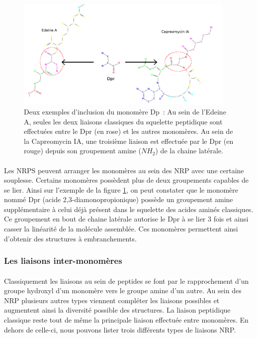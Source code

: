 \documentclass[12pt,french,twoside]{report}
\begin{document}
\begin{figure}[h!]
  \begin{center}
    \includegraphics[width=400px]{Figures/bio/Intro/Dpr/2-3_liaisons.png}
    \caption{\label{DPR_incl}Deux exemples d'inclusion du monomère Dp~:
    Au sein de l'Edeine A, seules les deux liaisons classiques du squelette peptidique sont effectuées entre le Dpr (en rose) et les autres monomères.
    Au sein de la Capreomycin IA, une troisième liaison est effectuée par le Dpr (en rouge) depuis son groupement amine ($NH_2$) de la chaine latérale.}
  \end{center}
\end{figure}

\paragraph{}Les NRPS peuvent arranger les monomères au sein des NRP avec une certaine souplesse.
Certains monomères possèdent plus de deux groupements capables de se lier.
Ainsi sur l'exemple de la figure \ref{DPR_incl}, on peut constater que le monomère nommé Dpr (acide 2,3-diamonopropionique) possède un groupement amine supplémentaire à celui déjà présent dans le squelette des acides aminés classiques.
Ce groupement en bout de chaine latérale autorise le Dpr à se lier 3 fois et ainsi casser la linéarité de la molécule assemblée.
Ces monomères permettent ainsi d'obtenir des structures à embranchements.


\subsubsection{Les liaisons inter-monomères}

\paragraph{}Classiquement les liaisons au sein de peptides se font par le rapprochement d'un groupe hydroxyl d'un monomère vers le groupe amine d'un autre.
Au sein des NRP plusieurs autres types viennent compléter les liaisons possibles et augmentent ainsi la diversité possible des structures.
La liaison peptidique classique reste tout de même la principale liaison effectuée entre monomères.
En dehors de celle-ci, nous pouvons lister trois différents types de liaisons NRP.
\end{document}
